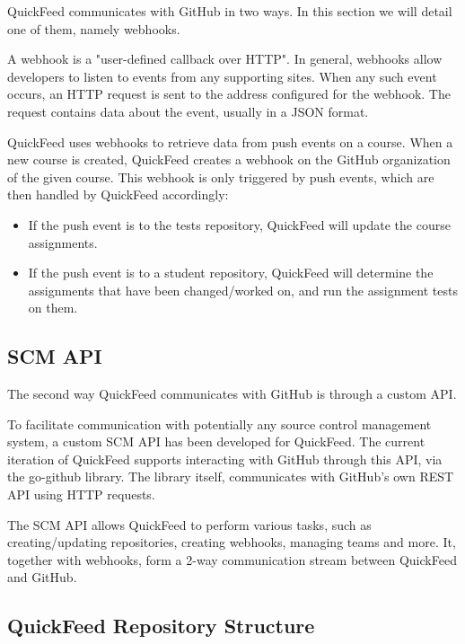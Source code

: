 QuickFeed communicates with GitHub in two ways.
In this section we will detail one of them, namely webhooks.

A webhook is a "user-defined callback over HTTP". %
In general, webhooks allow developers to listen to events from any supporting sites.
When any such event occurs, an HTTP request is sent to the address configured for the webhook.
The request contains data about the event, usually in a JSON format.

QuickFeed uses webhooks to retrieve data from push events on a course.
When a new course is created, QuickFeed creates a webhook on the GitHub organization of the given course.
This webhook is only triggered by push events, which are then handled by QuickFeed accordingly:

\begin{itemize}
    \item If the push event is to the tests repository, QuickFeed will update the course assignments.
    \item If the push event is to a student repository, QuickFeed will determine the assignments that have been changed/worked on, 
    and run the assignment tests on them.
\end{itemize}


\subsection{SCM API}
The second way QuickFeed communicates with GitHub is through a custom API.

To facilitate communication with potentially any source control management system, a custom SCM API has been developed for QuickFeed.
The current iteration of QuickFeed supports interacting with GitHub through this API, via the go-github library. %
The library itself, communicates with GitHub's own REST API using HTTP requests.

The SCM API allows QuickFeed to perform various tasks, such as creating/updating repositories, creating webhooks, managing teams and more.
It, together with webhooks, form a 2-way communication stream between QuickFeed and GitHub.

\subsection{QuickFeed Repository Structure}
\label{sec:quickfeed-repository-structure}

